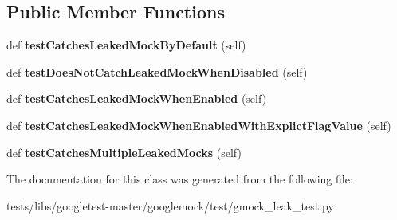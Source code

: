 \subsection*{Public Member Functions}
\begin{DoxyCompactItemize}
\item 
\mbox{\label{classtests_1_1libs_1_1googletest-master_1_1googlemock_1_1test_1_1gmock__leak__test_1_1GMockLeakTest_a5bc9cd7beece3c78cfc23bf454280691}} 
def {\bfseries test\+Catches\+Leaked\+Mock\+By\+Default} (self)
\item 
\mbox{\label{classtests_1_1libs_1_1googletest-master_1_1googlemock_1_1test_1_1gmock__leak__test_1_1GMockLeakTest_a704304b1b92d2f7eb9852d8483be68ef}} 
def {\bfseries test\+Does\+Not\+Catch\+Leaked\+Mock\+When\+Disabled} (self)
\item 
\mbox{\label{classtests_1_1libs_1_1googletest-master_1_1googlemock_1_1test_1_1gmock__leak__test_1_1GMockLeakTest_aed96eb86cb4ecf2b46a74f5e587df4ed}} 
def {\bfseries test\+Catches\+Leaked\+Mock\+When\+Enabled} (self)
\item 
\mbox{\label{classtests_1_1libs_1_1googletest-master_1_1googlemock_1_1test_1_1gmock__leak__test_1_1GMockLeakTest_a9ecdefb9bf9c54df0694774622f83f77}} 
def {\bfseries test\+Catches\+Leaked\+Mock\+When\+Enabled\+With\+Explict\+Flag\+Value} (self)
\item 
\mbox{\label{classtests_1_1libs_1_1googletest-master_1_1googlemock_1_1test_1_1gmock__leak__test_1_1GMockLeakTest_a5f7b767ae9ac84f8f0c42bdbbc2f6811}} 
def {\bfseries test\+Catches\+Multiple\+Leaked\+Mocks} (self)
\end{DoxyCompactItemize}


The documentation for this class was generated from the following file\+:\begin{DoxyCompactItemize}
\item 
tests/libs/googletest-\/master/googlemock/test/gmock\+\_\+leak\+\_\+test.\+py\end{DoxyCompactItemize}
